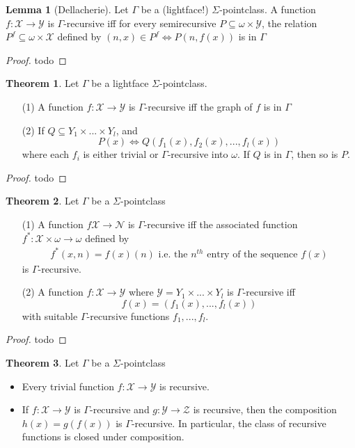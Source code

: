 \documentclass{article}
\theoremstyle{definition}
\newtheorem{lemma}{Lemma}[section]
\newtheorem{theorem}{Theorem}[section]
\theoremstyle{plain}
\begin{document}
\begin{lemma}[Dellacherie]
    Let $\Gamma$ be a (lightface!) $\Sigma$-pointclass. A function $f:\mathcal{X} \to \mathcal{Y}$ is $\Gamma$-recursive iff for every semirecursive $P \subseteq \omega \times \mathcal{Y}$, the relation $P^f \subseteq \omega \times \mathcal{X}$ defined by $(n,x) \in P^f \iff P(n,f(x))$ is in $\Gamma$
\end{lemma}
\begin{proof}
    todo
\end{proof}
\begin{theorem}
    Let $\Gamma$ be a lightface $\Sigma$-pointclass. 
    \begin{itemize}
        \item[(1)] A function $f:\mathcal{X} \to \mathcal{Y}$ is $\Gamma$-recursive iff the graph of $f$ is in $\Gamma$
        \item[(2)] If $Q \subseteq Y_1 \times ... \times Y_l$, and 
        \[ P(x) \iff Q(f_1(x),f_2(x),...,f_l(x)) \]
        where each $f_i$ is either trivial or $\Gamma$-recursive into $\omega$. If $Q$ is in $\Gamma$, then so is $P$.
    \end{itemize}
\end{theorem}
\begin{proof}
    todo
\end{proof}
\begin{theorem}
    Let $\Gamma$ be a $\Sigma$-pointclass 
    \begin{itemize}
        \item[(1)] A function $f\mathcal{X} \to \mathcal{N}$ is $\Gamma$-recursive iff the associated function $f^*:\mathcal{X} \times \omega \to \omega$ defined by 
        \begin{align}
            f^*(x,n) = f(x)(n) \textrm{ i.e. the $n^{th}$ entry of the sequence $f(x)$} 
        \end{align} 
        is $\Gamma$-recursive.
        \item[(2)] A function $f:\mathcal{X} \to \mathcal{Y}$ where $\mathcal{Y} = Y_1 \times ... \times Y_l$ is $\Gamma$-recursive iff 
        \[ f(x) = (f_1(x),...,f_l(x)) \]
        with suitable $\Gamma$-recursive functions $f_1,...,f_l$.
    \end{itemize}
\end{theorem}
\begin{proof}
    todo
\end{proof}
\begin{theorem}
    Let $\Gamma$ be a $\Sigma$-pointclass
    \begin{itemize}
        \item Every trivial function $f:\mathcal{X} \to \mathcal{Y}$ is recursive.
        \item If $f:\mathcal{X} \to \mathcal{Y}$ is $\Gamma$-recursive and $g:\mathcal{Y} \to \mathcal{Z}$ is recursive, then the composition $h(x) = g(f(x))$ is $\Gamma$-recursive. In particular, the class of recursive functions is closed under composition.
    \end{itemize}
\end{theorem}
\end{document}
